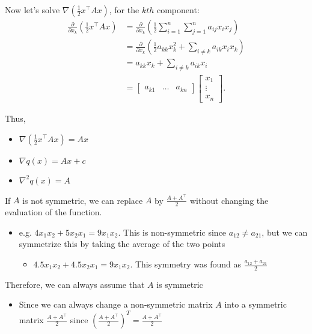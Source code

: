 \begin{example}
    Now let's solve $\nabla\left(\frac{1}{2} x^\top A x\right)$, for the $kth$ component:
    \begin{align*}
     \frac{\partial}{\partial x_k} \left(\frac{1}{2} x^\top A x\right) &= \frac{\partial}{\partial x_k} \left( \frac{1}{2} \sum_{i=1}^n \sum_{j=1}^n a_{ij} x_i x_j \right) \\
    &= \frac{\partial}{\partial x_k} \left( \frac{1}{2} a_{kk} x_k^2 + \sum_{i \neq k} a_{ik} x_i x_k \right) \\
    &= a_{kk} x_k + \sum_{i \neq k} a_{ik} x_i \\
    &= \begin{bmatrix}
    a_{k1} & \dots & a_{kn}
    \end{bmatrix}
    \begin{bmatrix}
    x_1 \\
    \vdots \\
    x_n
    \end{bmatrix}.
    \end{align*}

    Thus,
    \begin{itemize}
        \item $\nabla\left(\frac{1}{2} x^\top A x\right) = A x$
        \item $\nabla q(x) = A x + c$
        \item $\nabla^2 q(x) = A$
    \end{itemize}
\end{example}

\begin{warning}
    If \(A\) is not symmetric, we can replace \(A\) by \( \frac{A + A^\top}{2} \) without changing the evaluation of the function.

    \begin{itemize}
        \item e.g. \(4  x_1 x_2 + 5 x_2 x_1 = 9 x_1 x_ 2\). This is non-symmetric since $a_{12} \neq a_{21}$, but we can symmetrize this by taking the average of the two points 
        \begin{itemize}
            \item $4.5 x_1 x_2 + 4.5 x_2 x_1 = 9 x_1 x_2$. This symmetry was found as $\frac{a_{12} + a_{21}}{2}$
        \end{itemize}
    \end{itemize}
    \vspace{1em}

    Therefore, we can always assume that \(A\) is symmetric 
    \begin{itemize}
        \item Since we can always change a non-symmetric matrix $A$ into a symmetric matrix \( \frac{A + A^\top}{2} \) since \( \left(\frac{A + A^\top}{2}\right)^T =\frac{A + A^\top}{2} \)
    \end{itemize}
\end{warning}


